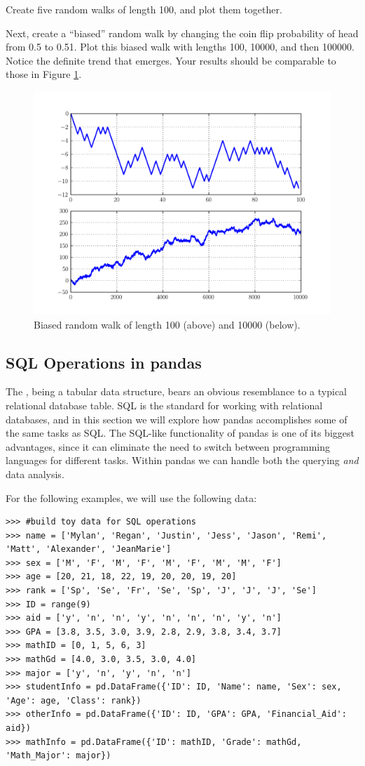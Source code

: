 \begin{problem}
Create five random walks of length 100, and plot them together.

Next, create a ``biased'' random walk by changing the coin flip probability of head from 0.5 to 0.51.
Plot this biased walk with lengths 100, 10000, and then 100000. Notice the definite trend that emerges.
Your results should be comparable to those in Figure \ref{pandas:biasedRandomWalk}.
\end{problem}

\begin{figure}
\centering
\includegraphics[width=.7 \textwidth]{biasedRandomWalk.pdf}
\caption{Biased random walk of length 100 (above) and 10000 (below).}
\label{pandas:biasedRandomWalk}
\end{figure}

\subsection*{SQL Operations in pandas}
The , being a tabular data structure, bears an obvious resemblance to a typical relational
database table. SQL is the standard for working with relational databases, and in this section we will
explore how pandas accomplishes some of the same tasks as SQL. The SQL-like functionality of pandas is
one of its biggest advantages, since it can eliminate the need to switch between programming languages
for different tasks. Within pandas we can handle both the querying \emph{and} data analysis.

For the following examples, we will use the following data:
\begin{lstlisting}
>>> #build toy data for SQL operations
>>> name = ['Mylan', 'Regan', 'Justin', 'Jess', 'Jason', 'Remi', 'Matt', 'Alexander', 'JeanMarie']
>>> sex = ['M', 'F', 'M', 'F', 'M', 'F', 'M', 'M', 'F']
>>> age = [20, 21, 18, 22, 19, 20, 20, 19, 20]
>>> rank = ['Sp', 'Se', 'Fr', 'Se', 'Sp', 'J', 'J', 'J', 'Se']
>>> ID = range(9)
>>> aid = ['y', 'n', 'n', 'y', 'n', 'n', 'n', 'y', 'n']
>>> GPA = [3.8, 3.5, 3.0, 3.9, 2.8, 2.9, 3.8, 3.4, 3.7]
>>> mathID = [0, 1, 5, 6, 3]
>>> mathGd = [4.0, 3.0, 3.5, 3.0, 4.0]
>>> major = ['y', 'n', 'y', 'n', 'n']
>>> studentInfo = pd.DataFrame({'ID': ID, 'Name': name, 'Sex': sex, 'Age': age, 'Class': rank})
>>> otherInfo = pd.DataFrame({'ID': ID, 'GPA': GPA, 'Financial_Aid': aid})
>>> mathInfo = pd.DataFrame({'ID': mathID, 'Grade': mathGd, 'Math_Major': major})
\end{lstlisting}

